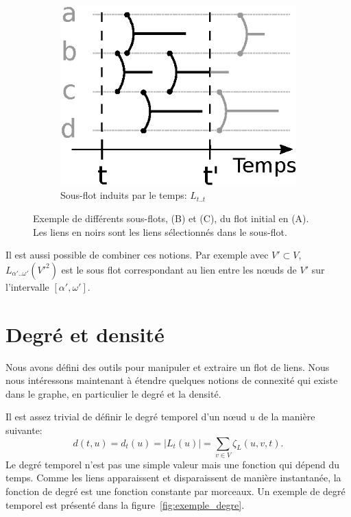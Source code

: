 \begin{figure}[]
	\begin{subfigure}{0.2\linewidth}
		\includegraphics[width=\linewidth]{img/Intro/sous_flots2.eps}\hfill
		\caption{Sous-flot induits par le temps:  $L_{t..t}$}
		\label{fig:exemple_sous_flot2}	
	\end{subfigure}
	\caption{Exemple de différents sous-flots, (B) et (C), du flot initial en (A). Les liens en noirs sont les liens sélectionnés dans le sous-flot. }
\label{fig:exemple_sous_flot}
\end{figure}

Il est aussi possible de combiner ces notions.
Par exemple avec $V' \subset V$, $L_{\alpha'..\omega'}(V'^2)$ est le sous flot correspondant au lien entre les n\oe uds de $V'$ sur l'intervalle $[\alpha', \omega']$.


\section{Degré et densité}
Nous avons défini des outils pour manipuler et extraire un flot de liens.
Nous nous intéressons maintenant à étendre quelques notions de connexité qui existe dans le graphe, en particulier le degré et la densité.

Il est assez trivial de définir le degré temporel d'un n\oe ud $u$ de la manière suivante:
\begin{equation}
d(t,u)=d_t(u)= |L_t(u)|= \sum_{v \in V} \zeta_{L}(u,v,t).
\end{equation}
Le degré temporel n'est pas une simple valeur mais une fonction qui dépend du temps.
Comme les liens apparaissent et disparaissent de manière instantanée, la fonction de degré est une fonction constante par morceaux.
Un exemple de degré temporel est présenté dans la figure~\ref{fig:exemple_degre}.

